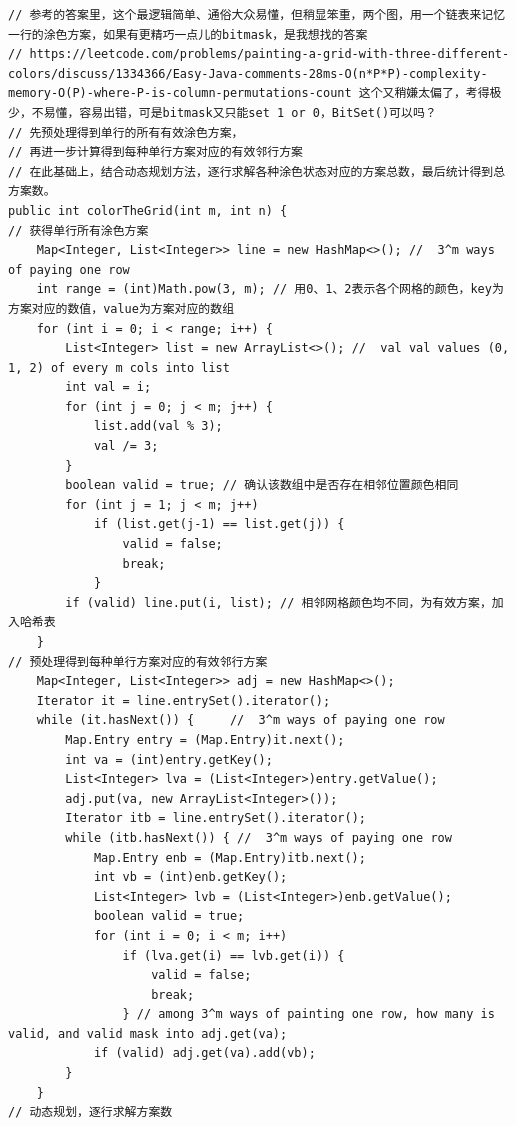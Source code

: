 \documentclass[9pt, b5paper]{article}
\begin{document}
\begin{verbatim}
// 参考的答案里，这个最逻辑简单、通俗大众易懂，但稍显笨重，两个图，用一个链表来记忆一行的涂色方案，如果有更精巧一点儿的bitmask，是我想找的答案
// https://leetcode.com/problems/painting-a-grid-with-three-different-colors/discuss/1334366/Easy-Java-comments-28ms-O(n*P*P)-complexity-memory-O(P)-where-P-is-column-permutations-count 这个又稍嫌太偏了，考得极少，不易懂，容易出错，可是bitmask又只能set 1 or 0，BitSet()可以吗？
// 先预处理得到单行的所有有效涂色方案，
// 再进一步计算得到每种单行方案对应的有效邻行方案
// 在此基础上，结合动态规划方法，逐行求解各种涂色状态对应的方案总数，最后统计得到总方案数。
public int colorTheGrid(int m, int n) {
// 获得单行所有涂色方案
    Map<Integer, List<Integer>> line = new HashMap<>(); //  3^m ways of paying one row
    int range = (int)Math.pow(3, m); // 用0、1、2表示各个网格的颜色，key为方案对应的数值，value为方案对应的数组
    for (int i = 0; i < range; i++) {
        List<Integer> list = new ArrayList<>(); //  val val values (0, 1, 2) of every m cols into list
        int val = i;
        for (int j = 0; j < m; j++) {
            list.add(val % 3);
            val /= 3;
        }
        boolean valid = true; // 确认该数组中是否存在相邻位置颜色相同
        for (int j = 1; j < m; j++) 
            if (list.get(j-1) == list.get(j)) {
                valid = false;
                break;
            }
        if (valid) line.put(i, list); // 相邻网格颜色均不同，为有效方案，加入哈希表
    }
// 预处理得到每种单行方案对应的有效邻行方案
    Map<Integer, List<Integer>> adj = new HashMap<>();
    Iterator it = line.entrySet().iterator();
    while (it.hasNext()) {     //  3^m ways of paying one row
        Map.Entry entry = (Map.Entry)it.next();
        int va = (int)entry.getKey();
        List<Integer> lva = (List<Integer>)entry.getValue();
        adj.put(va, new ArrayList<Integer>());
        Iterator itb = line.entrySet().iterator();
        while (itb.hasNext()) { //  3^m ways of paying one row
            Map.Entry enb = (Map.Entry)itb.next(); 
            int vb = (int)enb.getKey();
            List<Integer> lvb = (List<Integer>)enb.getValue();
            boolean valid = true;
            for (int i = 0; i < m; i++) 
                if (lva.get(i) == lvb.get(i)) {
                    valid = false;
                    break;
                } // among 3^m ways of painting one row, how many is valid, and valid mask into adj.get(va);
            if (valid) adj.get(va).add(vb); 
        }
    }
// 动态规划，逐行求解方案数

\end{verbatim}
\end{document}
